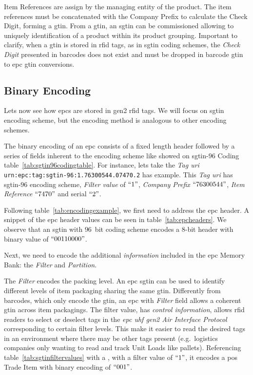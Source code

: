 Item References are assign by the managing entity of the product.
The item references must be concatenated with the Company Prefix to calculate the Check Digit, forming a \ac{gtin}.
From a \ac{gtin}, an \ac{sgtin} can be commissioned allowing to uniquely identification of a product within its product grouping.
Important to clarify, when a \ac{gtin} is stored in \ac{rfid} tags, as in \ac{sgtin} coding schemes, the \emph{Check Digit} presented in barcodes does not exist and must be dropped in barcode \ac{gtin} to \ac{epc} \ac{gtin} conversions.

\subsection{Binary Encoding} \label{sec:binencoding}

Lets now see how \acp{epc} are stored in \ac{gen2} \ac{rfid} tags.
We will focus on \ac{sgtin} encoding scheme, but the encoding method is analogous to other encoding schemes.

The binary encoding of an \ac{epc} consists of a fixed length header followed by a series of fields inherent to the encoding scheme like showed on \ac{sgtin}-$96$ Coding table~\ref{tab:sgtin96codingtable}.
For instance, lets take the \emph{Tag \ac{uri}}
\texttt{urn:epc:tag:sgtin-96:1.76300544.07470.2}
has example.
This \emph{Tag \ac{uri}} has \ac{sgtin}-$96$ encoding scheme, \emph{Filter value} of $``1"$, \emph{Company Prefix} $``76300544"$, \emph{Item Reference} $``7470"$ and serial $``2"$.

Following table~\ref{tab:encodingexample}, we first need to address the \ac{epc} header.
A snippet of the \ac{epc} header values can be seen in table~\ref{tab:epcheaders}. We observe that an \ac{sgtin} with $96$~bit coding scheme encodes a $8$-bit header with binary value of $``00110000"$.

Next, we need to encode the additional \textit{information} included in the \ac{epc} Memory Bank: the \emph{Filter} and \emph{Partition}. 

The \emph{Filter} encodes the packing level. An \ac{epc} \ac{sgtin} can be used to identify different levels of item packaging sharing the same \ac{gtin}. Differently from barcodes, which only encode the \ac{gtin}, an \ac{epc} with \emph{Filter} field allows a coherent \ac{gtin} across item packagings.
The filter value, has \textit{control information}, allows \ac{rfid} readers to select or deselect tags in the \emph{\ac{epc} \ac{uhf} \ac{gen2} Air Interface Protocol} corresponding to certain filter levels. This make it easier to read the desired tags in an environment where there may be other tags present (e.g.\ logistics companies only wanting to read and track Unit Loads like pallets).
Referencing table~\ref{tab:sgtinfiltervalues} with a , with a filter value of $``1"$, it encodes a \ac{pos} Trade Item with binary encoding of $``001"$.

